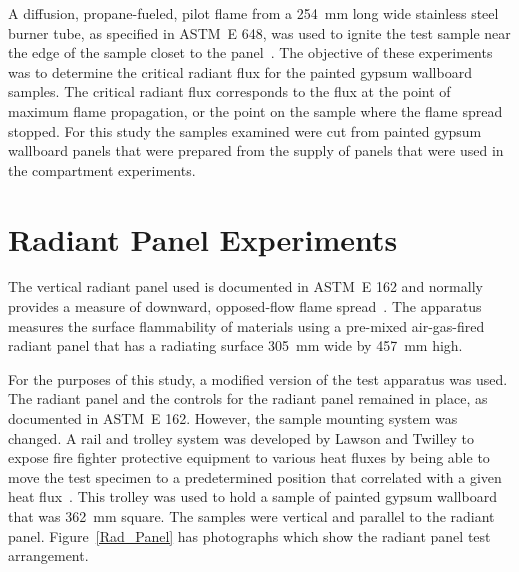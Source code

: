 \documentclass[twoside]{uocthesis}
\begin{document}
{A diffusion, propane-fueled, pilot flame from a 254~mm long wide stainless steel burner tube, as specified in ASTM~E 648, was used to ignite the test sample near the edge of the sample closet to the panel~\cite{ASTM_E648}. The objective of these experiments was to determine the critical radiant flux for the painted gypsum wallboard samples.  The critical radiant flux corresponds to the flux at the point of maximum flame propagation, or the point on the sample where the flame spread stopped. For this study the samples examined were cut from painted gypsum wallboard panels that were prepared from the supply of panels that were used in the compartment experiments.  



\section{Radiant Panel Experiments}

The vertical radiant panel used is documented in ASTM~E 162 and normally provides a measure of downward, opposed-flow flame spread~\cite{ASTM_E162}.  The apparatus measures the surface flammability of materials using a pre-mixed air-gas-fired radiant panel that has a radiating surface 305~mm wide by 457~mm high.

For the purposes of this study, a modified version of the test apparatus was used.  The radiant panel and the controls for the radiant panel remained in place, as documented in ASTM~E 162. However, the sample mounting system was changed. A rail and trolley system was developed by Lawson and Twilley to expose fire fighter protective equipment to various heat fluxes by being able to move the test specimen to a predetermined position that correlated with a given heat flux~\cite{Lawson:1999}.  This trolley was used to hold a sample of painted gypsum wallboard that was 362~mm square.  The samples were vertical and parallel to the radiant panel. Figure~\ref{Rad_Panel} has photographs which show the radiant panel test arrangement.

}
\end{document}
